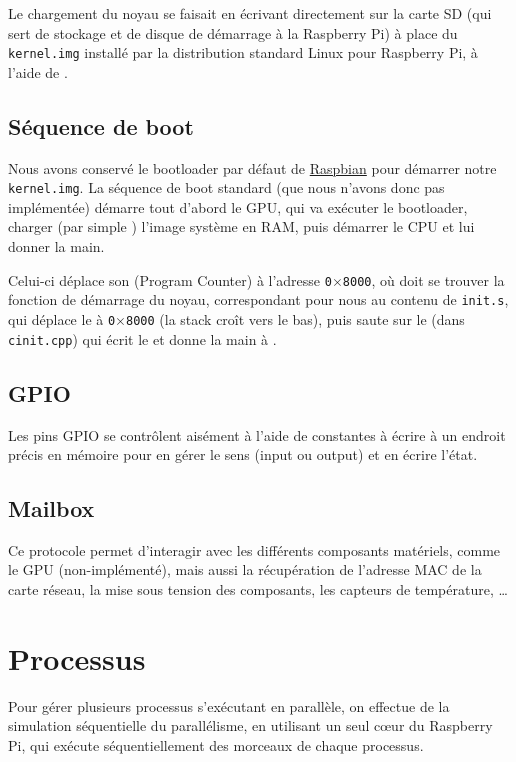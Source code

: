 \documentclass[11pt,a4paper]{article}
\newcommand{\hex}[1]{\texttt{0$\times$#1}}
\newcommand{\fname}[1]{\texttt{#1}} %
\begin{document}
Le chargement du noyau se faisait en écrivant directement sur la carte SD
(qui sert de stockage et de disque de démarrage à la Raspberry Pi) à place
du \fname{kernel.img} installé par la distribution standard Linux pour
Raspberry Pi, à l'aide de .

\subsection{Séquence de boot}
Nous avons conservé le bootloader par défaut de
\href{https://www.raspberrypi.org/downloads/raspbian/}{Raspbian} pour démarrer
notre \fname{kernel.img}. La séquence de boot standard (que nous n'avons donc
pas implémentée) démarre tout d'abord le GPU, qui va exécuter le bootloader,
charger (par simple ) l'image système en RAM, puis démarrer le
CPU et lui donner la main.

Celui-ci déplace son  (Program Counter) à l'adresse \hex{8000},
où doit se trouver la fonction de démarrage du noyau, correspondant pour nous
au contenu de \fname{init.s}, qui déplace le  à \hex{8000} (la stack
croît vers le bas), puis saute sur le  (dans \fname{cinit.cpp})
qui écrit le  et donne la main à .

\subsection{GPIO}
Les pins GPIO se contrôlent aisément à l'aide de constantes à écrire à un
endroit précis en mémoire pour en gérer le sens (input ou output) et en écrire
l'état.

\subsection{Mailbox}
Ce protocole permet d'interagir avec les différents composants matériels,
comme le GPU (non-implémenté), mais aussi la récupération de l'adresse MAC
de la carte réseau, la mise sous tension des composants, les capteurs de
température, \ldots

\section{Processus}

Pour gérer plusieurs processus s'exécutant en parallèle, on effectue
de la simulation séquentielle du parallélisme, en utilisant un seul
cœur du Raspberry Pi, qui exécute séquentiellement des morceaux de
chaque processus.
\end{document}
